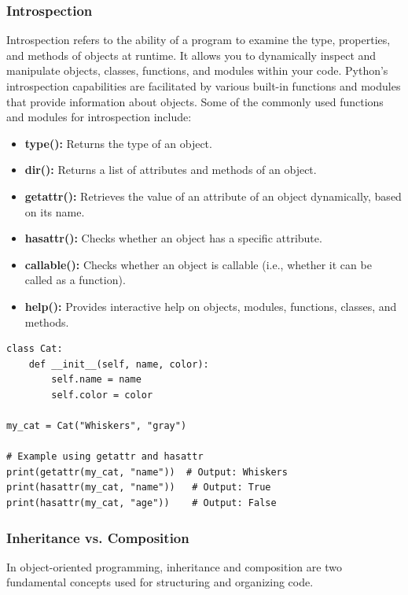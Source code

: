 \subsubsection{Introspection}
Introspection refers to the ability of a program to examine the type, properties, and methods of objects at runtime. It allows you to dynamically inspect and manipulate objects, classes, functions, and modules within your code. Python's introspection capabilities are facilitated by various built-in functions and modules that provide information about objects. Some of the commonly used functions and modules for introspection include:

\begin{itemize}
    \item \textbf{type():} Returns the type of an object.
    \item \textbf{dir():} Returns a list of attributes and methods of an object.
    \item \textbf{getattr():} Retrieves the value of an attribute of an object dynamically, based on its name.
    \item \textbf{hasattr():} Checks whether an object has a specific attribute.
    \item \textbf{callable():} Checks whether an object is callable (i.e., whether it can be called as a function).
    \item \textbf{help():} Provides interactive help on objects, modules, functions, classes, and methods.
\end{itemize}

\begin{codebox}
\begin{verbatim}
class Cat:
    def __init__(self, name, color):
        self.name = name
        self.color = color

my_cat = Cat("Whiskers", "gray")

# Example using getattr and hasattr
print(getattr(my_cat, "name"))  # Output: Whiskers
print(hasattr(my_cat, "name"))   # Output: True
print(hasattr(my_cat, "age"))    # Output: False
\end{verbatim}
\end{codebox}


\newpage
\subsubsection{Inheritance vs. Composition}
In object-oriented programming, inheritance and composition are two fundamental concepts used for structuring and organizing code.\\

